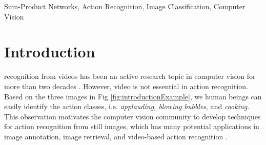 \documentclass[journal]{IEEEtran}
\begin{document}
\begin{IEEEkeywords}
Sum-Product Networks, Action Recognition, Image Classification, Computer Vision
\end{IEEEkeywords}






%
\IEEEpeerreviewmaketitle



\section{Introduction}
%
%
%
%
%
%





 recognition from videos has been an active research topic in computer vision for more than two decades \cite{computers2020088,TCSCVT_1,TCSVT_2,TCSVT_3,TCSVT_4,reviewer1_6918650,reviewer1_Baccouche:2011:SDL:2177908.2177914,reviewer1_Dobhal2015178}. However, video is not essential in action recognition. Based on the three images in Fig \ref{fig:introductionExample}, we human beings can easily identify the action classes, i.e. \textit{applauding, blowing bubbles}, and \textit{cooking}. This observation motivates the computer vision community to develop techniques for action recognition from still images, which has many potential applications in image annotation, image retrieval, and video-based action recognition \cite{StillImageSurvey}.
\end{document}
